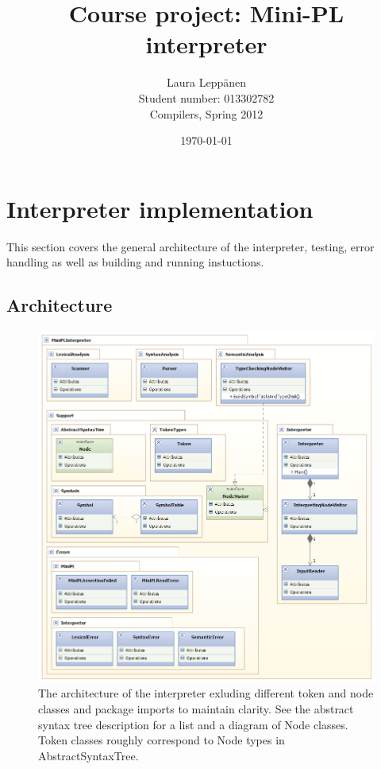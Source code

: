 \documentclass[a4paper,11pt]{article}
\begin{document}
\title{Course project: Mini-PL interpreter}
\author{Laura Leppänen \\ Student number: 013302782 \\ Compilers, Spring 2012}
\date{\today}
\maketitle
\thispagestyle{empty}

\tableofcontents
\onehalfspacing

\newpage
\setcounter{page}{1}

\section{Interpreter implementation}

This section covers the general architecture of the interpreter, testing, error handling as well as building and running instuctions.

\subsection{Architecture}

\begin{figure}
    \includegraphics[scale=0.7]{architecture.png}
    \caption{The architecture of the interpreter exluding different token and node classes and package imports to maintain clarity. See the abstract syntax tree description for a list and a diagram of Node classes. Token classes roughly correspond to Node types in AbstractSyntaxTree.}
    \label{fig:architecture}
\end{figure}
\end{document}
